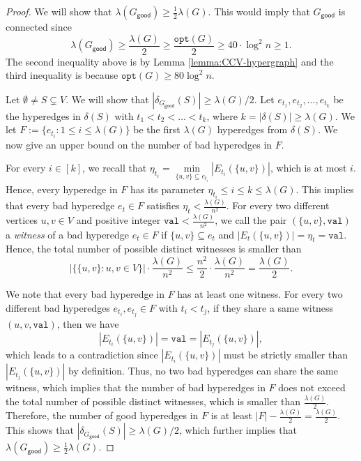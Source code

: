 \documentclass[11pt]{article}
\theoremstyle{definition}
\newcommand{\good}{\mathsf{good}}
\newcommand{\opt}{\texttt{opt}}
\begin{document}
\begin{proof}
We will show that $\lambda(G_{\good})\ge \frac{1}{2}\lambda(G)$. This would imply that $G_{\good}$ is connected since $$\lambda(G_{\good})\geq \frac{\lambda(G)}{2} \geq \frac{\opt(G)}{2} \geq 40\cdot \log^2n \ge 1.$$
The second inequality above is by Lemma \ref{lemma:CCV-hypergraph} and the third inequality is because $\opt(G)\ge 80\log^2{n}$. 

Let $\emptyset\neq S\subsetneq V$. We will show that $|\delta_{G_{\good}}(S)|\ge \lambda(G)/2$. 
    Let $e_{t_1}, e_{t_2}, \ldots, e_{t_k}$ be the hyperedges in $\delta(S)$ with $t_1<t_2<\ldots<t_k$, where $k=|\delta(S)|\geq \lambda(G)$. We let $F:=\{e_{t_i}:1\leq i \leq \lambda(G)\}$ be the first $\lambda(G)$ hyperedges from $\delta(S)$. We now give an upper bound on the number of bad hyperedges in $F$.
    
    For every $i\in [k]$, we recall that $\eta_{t_i}=\min\limits_{\{u,v\}\subseteq e_{t_i}}|E_{t_i}(\{u,v\})|$, which is at most $i$. Hence, every hyperedge in $F$ has its parameter $\eta_{t_i}\leq i \leq k \leq \lambda(G)$. This implies that every bad hyperedge $e_t\in F$ satisfies $\eta_t<\frac{\lambda(G)}{n^2}$. For every two different vertices $u, v \in V$ and positive integer $\texttt{val}<\frac{\lambda(G)}{n^2}$, we call the pair $(\{u, v\}, \texttt{val})$ a \emph{witness} of a bad hyperedge $e_t\in F$ if $\{u,v\}\subseteq e_t$ and $|E_t(\{u,v\})|=\eta_t=\texttt{val}$. Hence, the total number of possible distinct witnesses is smaller than $$|\{\{u,v\}: u,v\in V\}|\cdot \frac{\lambda(G)}{n^2}\leq \frac{n^2}{2}\cdot \frac{\lambda(G)}{n^2}=\frac{\lambda(G)}{2}.$$
    
    
    We note that every bad hyperedge in $F$ has at least one witness. For every two different bad hyperedges $e_{t_i}, e_{t_j} \in F$ with $t_i<t_j$, if they share a same witness $(u,v,\texttt{val})$, then we have 
    $$|E_{t_i}(\{u,v\})|=\texttt{val}=|E_{t_j}(\{u,v\})|,$$
which leads to a contradiction since $|E_{t_i}(\{u,v\})|$ must be strictly smaller than $|E_{t_j}(\{u,v\})|$ by definition. Thus, no two bad hyperedges can share the same witness, which implies that the number of bad hyperedges in $F$ does not exceed the total number of possible distinct witnesses, which is smaller than $\frac{\lambda(G)}{2}$. Therefore, the number of good hyperedges in $F$ is at least $|F|-\frac{\lambda(G)}{2}=\frac{\lambda(G)}{2}$. This shows that $|\delta_{G_{\good}}(S)|\ge \lambda(G)/2$, which further implies that $\lambda(G_{\good})\ge \frac{1}{2}\lambda(G)$.
    
\end{proof}
\end{document}
